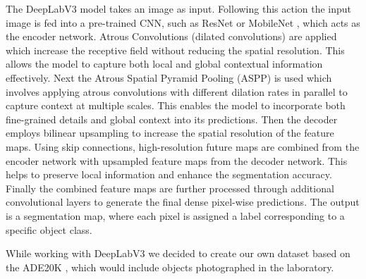 The DeepLabV3 model takes an image as input. Following this action the input image is fed into a pre-trained CNN, such as ResNet \cite{he2015deep} or MobileNet \cite{mobilenetv32019}, which acts as the encoder network. Atrous Convolutions (dilated convolutions) are applied which increase the receptive field without reducing the spatial resolution. This allows the model to capture both local and global contextual information effectively. Next the Atrous Spatial Pyramid Pooling (ASPP) is used which involves applying atrous convolutions with different dilation rates in parallel to capture context at multiple scales. This enables the model to incorporate both fine-grained details and global context into its predictions. Then the decoder employs bilinear upsampling to increase the spatial resolution of the feature maps. Using skip connections, high-resolution future maps are combined from the encoder network with upsampled feature maps from the decoder network. This helps to preserve local information and enhance the segmentation accuracy. Finally the combined feature maps are further processed through additional convolutional layers to generate the final dense pixel-wise predictions. The output is a segmentation map, where each pixel is assigned a label corresponding to a specific object class. 

While working with DeepLabV3 we decided to create our own dataset based on the ADE20K \cite{zhou2017scene, zhou2019semantic}, which would include objects photographed in the laboratory.

